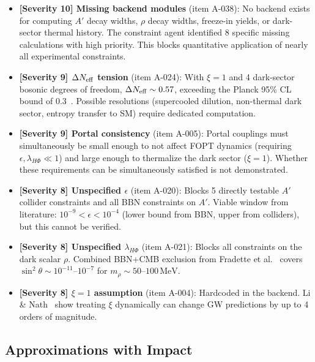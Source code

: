 \documentclass[a4paper,11pt]{article}
\newcommand{\MeV}{\,\text{MeV}}
\begin{document}
\begin{itemize}
\item \textbf{[Severity 10] Missing backend modules} (item A-038): No backend exists for computing $A'$ decay widths, $\rho$ decay widths, freeze-in yields, or dark-sector thermal history. The constraint agent identified 8 specific missing calculations with high priority. This blocks quantitative application of nearly all experimental constraints.

\item \textbf{[Severity 9] $\Delta N_{\rm eff}$ tension} (item A-024): With $\xi=1$ and 4 dark-sector bosonic degrees of freedom, $\Delta N_{\rm eff} \sim 0.57$, exceeding the Planck 95\% CL bound of 0.3~\cite{planck2018}. Possible resolutions (supercooled dilution, non-thermal dark sector, entropy transfer to SM) require dedicated computation.

\item \textbf{[Severity 9] Portal consistency} (item A-005): Portal couplings must simultaneously be small enough to not affect FOPT dynamics (requiring $\epsilon, \lambda_{H\Phi} \ll 1$) and large enough to thermalize the dark sector ($\xi=1$). Whether these requirements can be simultaneously satisfied is not demonstrated.

\item \textbf{[Severity 8] Unspecified $\epsilon$} (item A-020): Blocks 5 directly testable $A'$ collider constraints and all BBN constraints on $A'$. Viable window from literature: $10^{-9} < \epsilon < 10^{-4}$ (lower bound from BBN, upper from colliders), but this cannot be verified.

\item \textbf{[Severity 8] Unspecified $\lambda_{H\Phi}$} (item A-021): Blocks all constraints on the dark scalar $\rho$. Combined BBN+CMB exclusion from Fradette et al.~\cite{fradette2018} covers $\sin^2\theta \sim 10^{-11}$--$10^{-7}$ for $m_\rho \sim 50$--$100\MeV$.

\item \textbf{[Severity 8] $\xi=1$ assumption} (item A-004): Hardcoded in the backend. Li \& Nath~\cite{li2026} show treating $\xi$ dynamically can change GW predictions by up to 4 orders of magnitude.
\end{itemize}

\subsection{Approximations with Impact}
\end{document}
